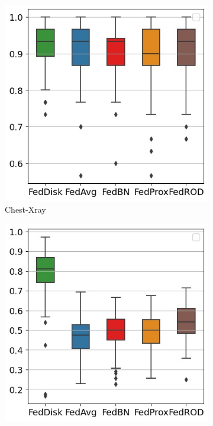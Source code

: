 \documentclass[mathfont=newtx]{uai2023} %
\begin{document}
\begin{figure}[ht!]
	\centering
	\begin{subfigure}[t]{0.3\linewidth}	
		\includegraphics[width=\linewidth]{Figures/xray/ClientAcc}
		\caption{Chest-Xray }
		\label{fig:cl_acc_xray}
	\end{subfigure}
	\hspace{0.01em}%
	\begin{subfigure}[t]{0.3\linewidth}
		\includegraphics[width=\linewidth]{Figures/femnist/ClientAcc}

\end{subfigure}
\end{figure}
\end{document}
